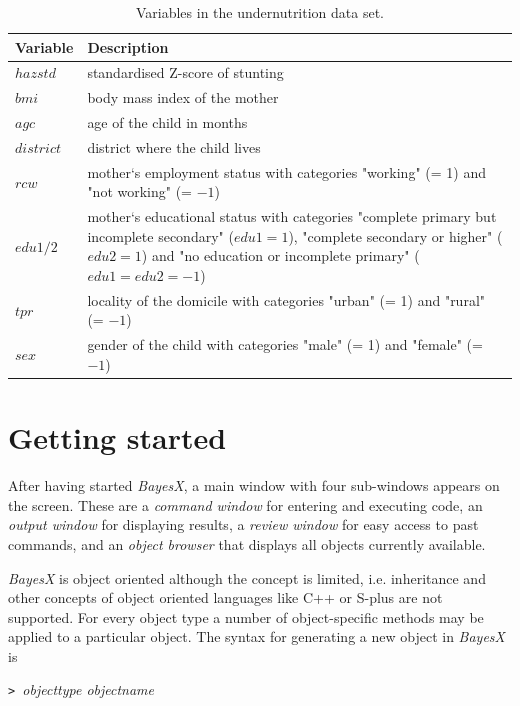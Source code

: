 \documentclass[a4paper]{article}
\begin{document}
{\footnotesize
\begin{table}[ht]
\begin{center}
\begin{tabular}{|l|p{12.5cm}|}
 \hline
 {\bf Variable} & {\bf Description}\\
 \hline
 $hazstd$ & standardised Z-score of stunting\\
 $bmi$ & body mass index of the mother\\
 $agc$ & age of the child in months\\
 $district$ & district where the child lives\\
 $rcw$ & mother`s employment status with categories "working" (= 1) and "not working" (= $-1$)\\
 $edu1/2$ & mother`s educational status with categories "complete primary but incomplete secondary" ($edu1=1$), "complete secondary or higher" ($edu2=1$) and "no education or incomplete primary" ($edu1=edu2=-1$)\\
 $tpr$ & locality of the domicile with categories "urban" (= 1) and "rural" (= $-1$)\\
 $sex$ & gender of the child with categories "male" (= 1) and
 "female" (= $-1$)\\
 \hline
\end{tabular}
{\it\caption{Variables in the undernutrition data set.
\label{zambiavar}}}
\end{center}
\end{table}}

\section{Getting started}\label{usage}

After having started {\em BayesX}, a main window with four
sub-windows appears on the screen. These are a {\em command
window} for entering and executing code, an {\em output window}
for displaying results, a {\em review window} for easy access to
past commands, and an {\em object browser} that displays all
objects currently available.

{\em BayesX} is object oriented although the concept is limited,
i.e. inheritance and other concepts of object oriented languages
like C++ or S-plus are not supported. For every object type a
number of object-specific methods may be applied to a particular
object. The syntax for generating a new object in {\em BayesX} is
\medskip

{\tt> }{\em objecttype objectname}
\medskip
\end{document}
